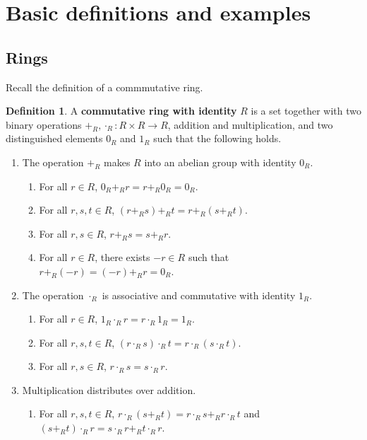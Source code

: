 \documentclass{article}
\newcommand{\rb}[1]{\left( #1 \right)}
\theoremstyle{definition}\newtheorem{definition}{Definition}[subsection]
\theoremstyle{definition}\newtheorem{remark}[definition]{Remark}
\theoremstyle{definition}\newtheorem*{example}{Example}
\theoremstyle{definition}\newtheorem*{note}{Note}
\begin{document}
\section{Basic definitions and examples}

\subsection{Rings}

Recall the definition of a commmutative ring.

\begin{definition}
A \textbf{commutative ring with identity} $ R $ is a set together with two binary operations $ +_R, \cdot_R : R \times R \to R $, addition and multiplication, and two distinguished elements $ 0_R $ and $ 1_R $ such that the following holds.
\begin{enumerate}
\item The operation $ +_R $ makes $ R $ into an abelian group with identity $ 0_R $.
\begin{enumerate}
\item For all $ r \in R $, $ 0_R +_R r = r +_R 0_R = 0_R $.
\item For all $ r, s, t \in R $, $ \rb{r +_R s} +_R t = r +_R \rb{s +_R t} $.
\item For all $ r, s \in R $, $ r +_R s = s +_R r $.
\item For all $ r \in R $, there exists $ -r \in R $ such that $ r +_R \rb{-r} = \rb{-r} +_R r = 0_R $.
\end{enumerate}
\item The operation $ \cdot_R $ is associative and commutative with identity $ 1_R $.
\begin{enumerate}
\item For all $ r \in R $, $ 1_R \cdot_R r = r \cdot_R 1_R = 1_R $.
\item For all $ r, s, t \in R $, $ \rb{r \cdot_R s} \cdot_R t = r \cdot_R \rb{s \cdot_R t} $.
\item For all $ r, s \in R $, $ r \cdot_R s = s \cdot_R r $.
\end{enumerate}
\item Multiplication distributes over addition.
\begin{enumerate}
\item For all $ r, s, t \in R $, $ r \cdot_R \rb{s +_R t} = r \cdot_R s +_R r \cdot_R t $ and $ \rb{s +_R t} \cdot_R r = s \cdot_R r +_R t \cdot_R r $.
\end{enumerate}
\end{enumerate}
\end{definition}
\end{document}
